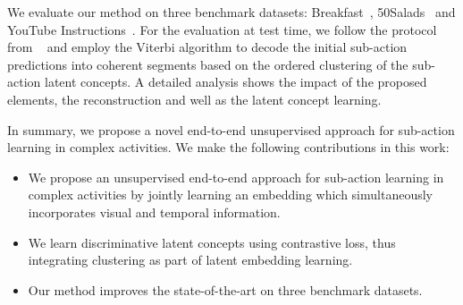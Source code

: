 \documentclass[final]{cvpr}
\begin{document}
\par We evaluate our method on three benchmark datasets: Breakfast~\cite{bf-Kuehne12}, 50Salads~\cite{50s-stein2013combining} and YouTube Instructions~\cite{Alayrac16unsupervised}.
For the evaluation at test time, we follow the protocol from ~\cite{kukleva2019unsupervised} and employ the Viterbi algorithm to decode the initial sub-action predictions into coherent segments based on the ordered clustering of the sub-action latent concepts.
A detailed analysis shows the impact of the proposed elements, the reconstruction and well as the latent concept learning. 


\par In summary, we propose a novel end-to-end unsupervised approach for sub-action learning in complex activities. We make the following contributions in this work:
\vspace{-0.15cm}
\begin{itemize}
    \item We propose an unsupervised end-to-end approach for sub-action learning in complex activities by jointly learning an embedding which simultaneously incorporates visual and temporal information.
    \item We learn discriminative latent concepts using contrastive loss, thus integrating clustering as part of latent embedding learning.
    \item Our method improves the state-of-the-art on three benchmark datasets.
\end{itemize}
\end{document}
